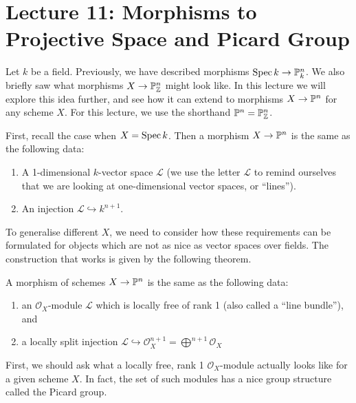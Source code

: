 \newpage	
\section*{Lecture 11: Morphisms to Projective Space and Picard Group}


Let \(k\) be a field.
Previously, we have described morphisms $\Spec k \to \P^n_k$. We also briefly saw what morphisms $X \to {\P_\Z^n}$ might look like. In this lecture we will explore this idea further, and see how it can extend to morphisms $X \to \P^n$ for any scheme $X$. For this lecture, we use the shorthand $\P^n = \P_\Z^n$.

First, recall the case when $X = \Spec k$. Then a morphism $X \to \P^n$ is the same as the following data:
\begin{enumerate}
	\item A 1-dimensional $k$-vector space $\mathcal{L}$ (we use the letter $\mathcal{L}$ to remind ourselves that we are looking at one-dimensional vector spaces, or ``lines'').
	\item An injection $\mathcal{L} \hookrightarrow k^{n+1}$.
\end{enumerate}

To generalise different $X$, we need to consider how these requirements can be formulated for objects which are not as nice as vector spaces over fields. The construction that works is given by the following theorem.
\begin{theorem}
	A morphism of schemes $X \to \P^n$ is the same as the following data:
	\begin{enumerate}
		\item an $\mathcal{O}_X$-module $\mathcal{L}$ which is locally free of rank 1 (also called a ``line bundle''), and
		\item a locally split injection $\mathcal{L} \hookrightarrow \mathcal{O}_X^{n+1} = \bigoplus^{n+1} \mathcal{O}_X$
	\end{enumerate}
\end{theorem}

First, we should ask what a locally free, rank 1 $\mathcal{O}_X$-module actually looks like for a given scheme $X$. In fact, the set of such modules has a nice group structure called the Picard group.


